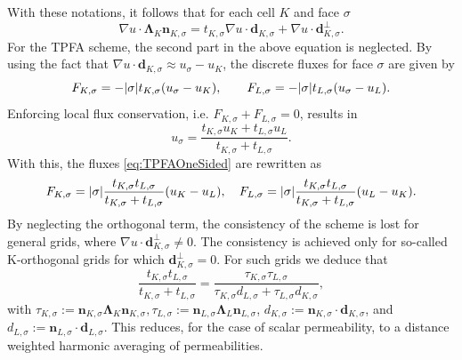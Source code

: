 With these notations, it follows that for each cell $K$ and face $\sigma$ 
\begin{equation}
\nabla u \cdot \mathbf{\Lambda}_K \mathbf{n}_{K, \sigma} =  t_{K,\sigma} \nabla u \cdot \mathbf{d}_{K,\sigma} + \nabla u \cdot \mathbf{d}^{\bot}_{K,\sigma}.
\end{equation}
For the TPFA scheme, the second part in the above equation is neglected. By using the fact that $\nabla u \cdot \mathbf{d}_{K,\sigma} \approx u_\sigma - u_K$, the discrete fluxes for face $\sigma$ are given by
\begin{equation}
F_{K,\sigma} = -\lvert{\sigma}\rvert  t_{K,\sigma} (u_\sigma - u_K), \qquad F_{L,\sigma} = -\lvert{\sigma}\rvert  t_{L,\sigma} (u_\sigma - u_L).
\label{eq:TPFAOneSided}
\end{equation}
Enforcing local flux conservation, i.e. $F_{K,\sigma}+F_{L,\sigma}=0$, results in 
\begin{equation}
u_\sigma = \frac{t_{K,\sigma} u_K + t_{L,\sigma} u_L}{t_{K,\sigma}  + t_{L,\sigma}}.
\end{equation}
With this, the fluxes \eqref{eq:TPFAOneSided} are rewritten as
\begin{equation}
F_{K,\sigma} = \lvert{\sigma}\rvert  \frac{t_{K,\sigma} t_{L,\sigma}}{t_{K,\sigma} + t_{L,\sigma}} (u_K - u_L), \quad F_{L,\sigma} = \lvert{\sigma}\rvert  \frac{t_{K,\sigma} t_{L,\sigma}}{t_{K,\sigma} + t_{L,\sigma}} (u_L - u_K).
\label{eq:TPFAFlux}
\end{equation}
By neglecting the orthogonal term, the consistency of the scheme is lost for general grids, where $\nabla u \cdot \mathbf{d}^{\bot}_{K,\sigma} \not = 0$. The consistency is achieved only for so-called K-orthogonal grids for which $\mathbf{d}^{\bot}_{K,\sigma} = 0$. For such grids we deduce that 
\begin{equation}
\frac{t_{K,\sigma} t_{L,\sigma}}{t_{K,\sigma} + t_{L,\sigma}} = \frac{\tau_{K,\sigma} \tau_{L,\sigma}}{\tau_{K,\sigma} d_{L,\sigma} + \tau_{L,\sigma} d_{K,\sigma}},
\label{eq:TPFAcoeffNew}
\end{equation}
with $\tau_{K,\sigma} := \mathbf{n}_{K, \sigma} \mathbf{\Lambda}_K\mathbf{n}_{K, \sigma}, \tau_{L,\sigma} := \mathbf{n}_{L, \sigma} \mathbf{\Lambda}_L\mathbf{n}_{L, \sigma}$, $d_{K,\sigma}:= \mathbf{n}_{K, \sigma} \cdot \mathbf{d}_{K, \sigma}$, and $d_{L,\sigma}:= \mathbf{n}_{L, \sigma} \cdot \mathbf{d}_{L, \sigma}$. This reduces, for the case of scalar permeability, to a distance weighted harmonic averaging of permeabilities.

 

